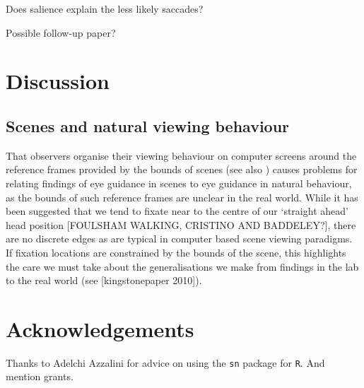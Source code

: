 \documentclass[a4paper, onecolumn, oneside, 11pt]{article}
\begin{document}
Does salience explain the less likely saccades? 

Possible follow-up paper?

\section{Discussion}



\subsection{Scenes and natural viewing behaviour}
That observers organise their viewing behaviour on computer screens around the reference frames provided by the bounds of scenes (see also \cite{Stainer:2013ce}) causes problems for relating findings of eye guidance in scenes to eye guidance in natural behaviour, as the bounds of such reference frames are unclear in the real world. While it has been suggested that we tend to fixate near to the centre of our `straight ahead' head position [FOULSHAM WALKING, CRISTINO AND BADDELEY?], there are no discrete edges as are typical in computer based scene viewing paradigms. If fixation locations are constrained by the bounds of the scene, this highlights the care we must take about the generalisations we make from findings in the lab to the real world (see [kingstonepaper 2010]). 






\section*{Acknowledgements}

Thanks to Adelchi Azzalini for advice on using the \texttt{sn} package for \texttt{R}. And mention grants. 


\small

\end{document}
